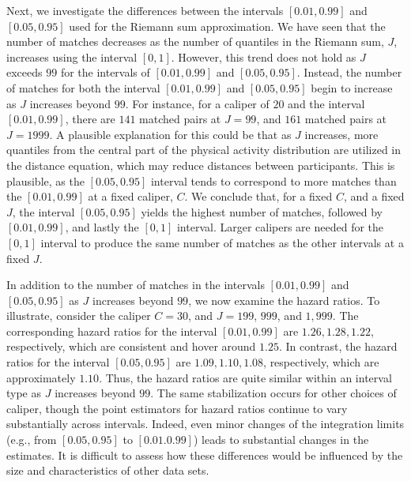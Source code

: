 Next, we investigate the differences between the intervals $[0.01,0.99]$ and $[0.05,0.95]$ used for the Riemann sum approximation. We have seen that the number of matches decreases as the number of quantiles in the Riemann sum, $J$, increases using the interval $[0,1]$. However, this trend does not hold as $J$ exceeds $99$ for the intervals of $[0.01,0.99]$ and $[0.05,0.95]$. Instead, the number of matches for both the interval $[0.01,0.99]$ and $[0.05,0.95]$ begin to increase as $J$ increases beyond $99$. For instance, for a caliper of $20$ and the interval $[0.01,0.99]$, there are $141$ matched pairs at $J=99$, and $161$ matched pairs at $J=1999$. A plausible explanation for this could be that as $J$ increases, more quantiles from the central part of the physical activity distribution are utilized in the distance equation, which may reduce distances between participants. This is plausible, as the $[0.05,0.95]$ interval tends to correspond to more matches than the $[0.01,0.99]$ at a fixed caliper, $C$. We conclude that, for a fixed $C$, and a fixed $J$, the interval $[0.05,0.95]$ yields the highest number of matches, followed by $[0.01,0.99]$, and lastly the $[0,1]$ interval. Larger calipers are needed for the $[0,1]$ interval to produce the same number of matches as the other intervals at a fixed $J$. 

In addition to the number of matches in the intervals $[0.01,0.99]$ and $[0.05,0.95]$ as $J$ increases beyond $99$, we now examine the hazard ratios. To illustrate, consider the caliper $C=30$, and $J=199$, $999$, and $1{,}999$. The corresponding hazard ratios for the interval $[0.01,0.99]$ are $1.26,1.28,1.22$, respectively, which are consistent and hover around $1.25$. In contrast, the hazard ratios for the interval $[0.05,0.95]$ are $1.09,1.10,1.08$, respectively, which are approximately $1.10$. Thus, the hazard ratios are quite similar within an interval type as $J$ increases beyond $99$. The same stabilization occurs for other choices of caliper, though the point estimators for hazard ratios continue to vary substantially across intervals. Indeed, even minor changes of the integration limits (e.g., from $[0.05,0.95]$ to $[0.01.0.99]$) leads to substantial changes in the estimates. It is difficult to assess how these differences would be influenced by the size and characteristics of other data sets. 

